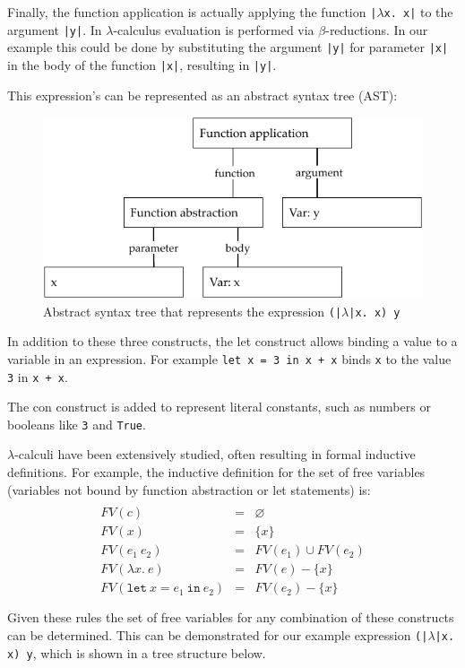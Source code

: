 \documentclass[a4paper,fleqn,oneside,12pt]{report}
\begin{document}
Finally, the function application is actually applying the function \texttt{|$\lambda$x. x|} to the argument \texttt{|y|}. In $\lambda$-calculus evaluation is performed via $\beta$-reductions. In our example this could be done by substituting the argument \texttt{|y|} for parameter \texttt{|x|} in the body of the function \texttt{|x|}, resulting in \texttt{|y|}.

This expression's can be represented as an abstract syntax tree (AST):

{\centering \begin{figure}[h!]
  \centering
  \includegraphics[width=0.8\linewidth]{images/ast_abs_id_y.pdf}
  \caption{Abstract syntax tree that represents the expression \texttt{(|$\lambda$|x. x) y}}
\end{figure} \par}

In addition to these three constructs, the let construct allows binding a value to a variable in an expression. For example \texttt{let x = 3 in x + x} binds \texttt{x} to the value \texttt{3} in \texttt{x + x}.

The con construct is added to represent literal constants, such as numbers or booleans like \texttt{3} and \texttt{True}.

$\lambda$-calculi have been extensively studied, often resulting in formal inductive definitions. For example, the inductive definition for the set of free variables (variables not bound by function abstraction or let statements) is:
$$\begin{array}{lcl}
  \\
    FV(c)                                       & = & \varnothing\\
    FV(x)                                       & = & \{ x \}\\
    FV(e_1\ e_2)                                & = & FV(e_1) \cup FV(e_2)\\
    FV(\lambda x.\ e  )                         & = & FV(e) - \{ x \}\\
    FV(\mathtt{let}\ x = e_1\ \mathtt{in}\ e_2) & = & FV(e_2) - \{ x \}\\
  \\
\end{array}$$
Given these rules the set of free variables for any combination of these constructs can be determined. This can be demonstrated for our example expression \texttt{(|$\lambda$|x. x) y}, which is shown in a tree structure below.
\end{document}
